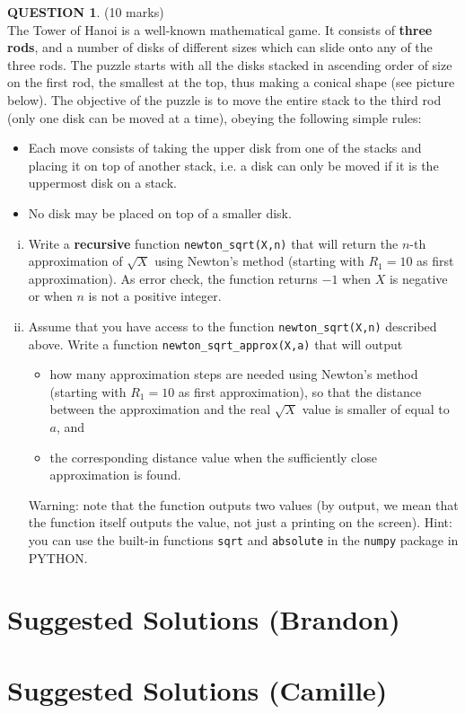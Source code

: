 \documentclass[a4paper,12pt]{article}
\theoremstyle{definition}
\newtheorem{ques}[dummy]{QUESTION}
\theoremstyle{plain}
\newcommand{\ttx}[1]{\texttt{#1}}
\begin{document}
\begin{ques}\hfill (10 marks)\vspace*{1em}\\
	The Tower of Hanoi is a well-known mathematical game. It consists of \textbf{three rods}, and a number of disks of different sizes which can slide onto any of the three rods. The puzzle starts with all the disks stacked in ascending order of size on the first rod, the smallest at the top, thus making a conical shape (see picture below). The objective of the puzzle is to move the entire stack to the third rod (only one disk can be moved at a time), obeying the following simple rules:
	\begin{itemize}
		\item Each move consists of taking the upper disk from one of the stacks and placing it on top of another stack, i.e. a disk can only be moved if it is the uppermost disk on a stack.
		
		\item No disk may be placed on top of a smaller disk.
	\end{itemize}
	
	\begin{enumerate}[(i)]
		\item Write a \textbf{recursive} function \ttx{newton\_sqrt(X,n)} that will return the $n$-th approximation of $\sqrt{X}$ using Newton's method (starting with $R_1 = 10$ as first approximation). As error check, the function returns $-1$ when $X$ is negative or when $n$ is not a positive integer.
		
		\item Assume that you have access to the function \ttx{newton\_sqrt(X,n)} described above. Write a function \ttx{newton\_sqrt\_approx(X,a)} that will output
		\begin{itemize}
			\item how many approximation steps are needed using Newton's method (starting with $R_1 = 10$ as first approximation), so that the distance between the approximation and the real $\sqrt{X}$ value is smaller of equal to $a$, and
			\item the corresponding distance value when the sufficiently close approximation is found.
		\end{itemize}
		Warning: note that the function outputs two values (by output, we mean that the function itself outputs the value, not just a printing on the screen). Hint: you can use the built-in functions \ttx{sqrt} and \ttx{absolute} in the \ttx{numpy} package in PYTHON.
	\end{enumerate}
\end{ques}


	
	\newpage
	\section*{Suggested Solutions (Brandon)}
	\newpage
	\section*{Suggested Solutions (Camille)}
\end{document}
